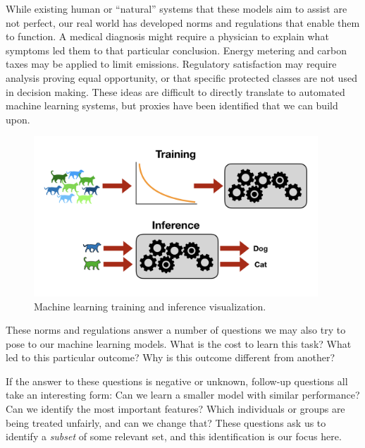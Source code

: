 While existing human or ``natural'' systems that these models aim to assist are not perfect, 
our real world has developed norms and regulations that 
enable them to function.
A medical diagnosis might require a physician to explain what symptoms led them to that particular conclusion.
Energy metering and carbon taxes may be applied to limit
emissions.
Regulatory satisfaction may require 
analysis proving equal opportunity,
or that specific protected classes
are not used in decision making.
These ideas are difficult to directly translate to automated machine learning systems,
but proxies have been identified that we can build upon.

\begin{figure}
    \centering
    \includegraphics[trim={0 3cm 0 3cm},clip,width=0.95\textwidth]{diss/1_intro/figs/dl.png}
    \caption[Modern machine learning pipelines]{Machine learning training and inference visualization.}
    \label{fig:dl}
\end{figure}
These norms and regulations answer a number of questions we may also try to pose to our machine learning models.
What is the cost to learn this task?
What led to this particular outcome?
Why is this outcome different from another?

If the answer to these questions is negative or unknown,  follow-up questions all take an interesting form:
Can we learn a smaller model with similar performance? 
Can we identify the most important features? 
Which individuals or groups are being treated unfairly, and can we change that?
These questions ask us to identify a \textit{subset} of some relevant set, and this identification is our focus here.

